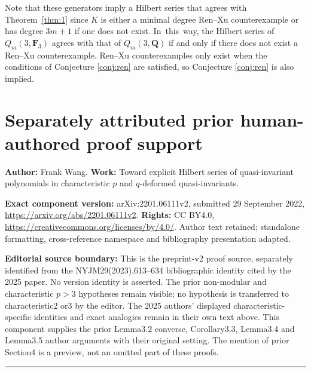 \documentclass[11pt]{article}
\numberwithin{equation}{section}
\theoremstyle{definition}
\numberwithin{equation}{section}
\begin{document}
 Note that these generators imply a Hilbert series that agrees with Theorem~\ref{thm:1} since $K$ is either a minimal degree Ren--Xu counterexample or has degree $3m+1$ if one does not exist. In~this~way, the Hilbert series of $Q_m(3,\mathbf{F}_3)$ agrees with that of $Q_m(3,\mathbf{Q})$ if and only if there does not exist a Ren--Xu counterexample. Ren--Xu counterexamples only exist when the conditions of Conjecture \ref{conj:ren} are satisfied, so Conjecture \ref{conj:ren} is also implied.

\clearpage
\section*{Separately attributed prior human-authored proof support}
\noindent\textbf{Author:} Frank Wang. \textbf{Work:} Toward explicit Hilbert series of quasi-invariant polynomials in characteristic $p$ and $q$-deformed quasi-invariants.\par
\noindent\textbf{Exact component version:} arXiv:2201.06111v2, submitted 29 September 2022, \url{https://arxiv.org/abs/2201.06111v2}. \textbf{Rights:} CC BY4.0, \url{https://creativecommons.org/licenses/by/4.0/}. Author text retained; standalone formatting, cross-reference namespace and bibliography presentation adapted.\par
\noindent\textbf{Editorial source boundary:} This is the preprint-v2 proof source, separately identified from the NYJM29(2023),613--634 bibliographic identity cited by the 2025 paper. No version identity is asserted. The prior non-modular and characteristic $p>3$ hypotheses remain visible; no hypothesis is transferred to characteristic2 or3 by the editor. The 2025 authors' displayed characteristic-specific identities and exact analogies remain in their own text above. This component supplies the prior Lemma3.2 converse, Corollary3.3, Lemma3.4 and Lemma3.5 author arguments with their original setting. The mention of prior Section4 is a preview, not an omitted part of these proofs.\par
\medskip\hrule\medskip
\begingroup
\theoremstyle{plain}
\newtheorem{theorem}{Theorem}[section]
\newtheorem{corollary}[theorem]{Corollary}
\newtheorem{lemma}[theorem]{Lemma}
\newtheorem{proposition}[theorem]{Proposition}
\newtheorem{conjecture}[theorem]{Conjecture}

\theoremstyle{definition}
\newtheorem{definition}[theorem]{Definition}
\newtheorem{example}[theorem]{Example}
\newtheorem{remark}[theorem]{Remark}

\setcounter{section}{1}
\let\WangOriginalLabel\label
\let\WangOriginalRef\ref
\let\WangOriginalEqref\eqref
\let\WangOriginalCite\cite
\makeatletter\let\WangOriginalDisplayLabel{}\makeatother
\renewcommand{\label}[1]{\WangOriginalLabel{wangv2:#1}}
\renewcommand{\ref}[1]{\WangOriginalRef{wangv2:#1}}
\renewcommand{\eqref}[1]{\WangOriginalEqref{#1}}
\renewcommand{\cite}[1]{\WangOriginalCite{wangv2:#1}}
\renewcommand{\char}{\text{char\,}}
\end{document}
